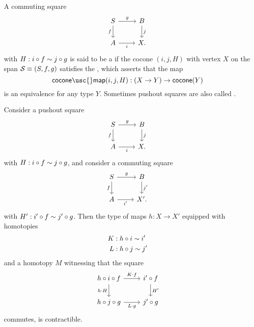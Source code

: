 \begin{defn}
  A commuting square
  \begin{equation*}
    \begin{tikzcd}
      S \arrow[r,"g"] \arrow[d,swap,"f"] & B \arrow[d,"j"] \\
      A \arrow[r,swap,"i"] & X.
    \end{tikzcd}
  \end{equation*}
  with $H:i\circ f \sim j\circ g$ is said to be a  if the cocone $(i,j,H)$ with vertex $X$ on the span $\mathcal{S}\equiv (S,f,g)$
  satisfies the , which asserts that the map
  \begin{equation*}
    \mathsf{cocone\usc{}map}(i,j,H):(X\to Y)\to \mathsf{cocone}(Y)
  \end{equation*}
  is an equivalence for any type $Y$. Sometimes pushout squares are also called .
\end{defn}

\begin{lem}\label{lem:unique-mapping-property-pushout}
  Consider a pushout square
  \begin{equation*}
    \begin{tikzcd}
      S \arrow[r,"g"] \arrow[d,swap,"f"] & B \arrow[d,"j"] \\
      A \arrow[r,swap,"i"] & X.
    \end{tikzcd}
  \end{equation*}
  with $H:i\circ f \sim j\circ g$, and consider a commuting square
  \begin{equation*}
    \begin{tikzcd}
      S \arrow[r,"g"] \arrow[d,swap,"f"] & B \arrow[d,"{j'}"] \\
      A \arrow[r,swap,"{i'}"] & X'.
    \end{tikzcd}
  \end{equation*}
  with $H':i'\circ f \sim j'\circ g$. Then the type of maps $h:X\to X'$ equipped with homotopies
  \begin{align*}
    K & : h\circ i \sim i' \\
    L & : h\circ j \sim j'
  \end{align*}
  and a homotopy $M$ witnessing that the square
  \begin{equation*}
    \begin{tikzcd}
      h\circ i\circ f \arrow[r,"K\cdot f"] \arrow[d,swap,"h\cdot H"] & i' \circ f \arrow[d,"{H'}"] \\
      h\circ j\circ g \arrow[r,swap,"L\cdot g"] & j'\circ g
    \end{tikzcd}
  \end{equation*}
  commutes, is contractible.
\end{lem}


